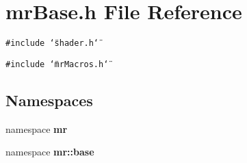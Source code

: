 \section{mr\-Base.h File Reference}
\label{mrBase_8h}
{\tt \#include \char`\"{}shader.h\char`\"{}}\par
{\tt \#include \char`\"{}mr\-Macros.h\char`\"{}}\par
\subsection*{Namespaces}
\begin{CompactItemize}
\item 
namespace {\bf mr}
\item 
namespace {\bf mr::base}
\end{CompactItemize}
